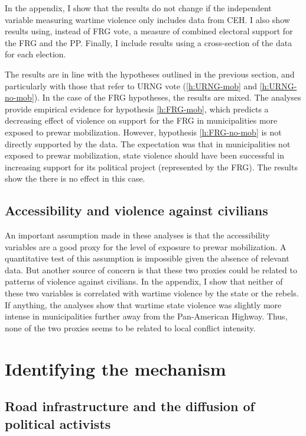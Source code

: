 \documentclass[12pt, notitlepage]{article}
\begin{document}
In the appendix, I show that the results do not change if the independent variable measuring wartime violence only includes data from CEH.
I also show results using, instead of FRG vote, a measure of combined electoral support for the FRG and the PP.
Finally, I include results using a cross-section of the data for each election.

The results are in line with the hypotheses outlined in the previous section, and particularly with those that refer to URNG vote (\ref{h:URNG-mob} and \ref{h:URNG-no-mob}).
In the case of the FRG hypotheses, the results are mixed.
The analyses provide empirical evidence for hypothesis \ref{h:FRG-mob}, which predicts a decreasing effect of violence on support for the FRG in municipalities more exposed to prewar mobilization.
However, hypothesis \ref{h:FRG-no-mob} is not directly supported by the data.
The expectation was that in municipalities not exposed to prewar mobilization, state violence should have been successful in increasing support for its political project (represented by the FRG).
The results show the there is no effect in this case.

\subsection*{Accessibility and violence against civilians}

An important assumption made in these analyses is that the accessibility variables are a good proxy for the level of exposure to prewar mobilization.
A quantitative test of this assumption is impossible given the absence of relevant data.
But another source of concern is that these two proxies could be related to patterns of violence against civilians.
In the appendix, I show that neither of these two variables is correlated with wartime violence by the state or the rebels.
If anything, the analyses show that wartime state violence was slightly more intense in municipalities further away from the Pan-American Highway.
Thus, none of the two proxies seems to be related to local conflict intensity.

\section*{Identifying the mechanism}

\subsection*{Road infrastructure and the diffusion of political activists}
\end{document}
